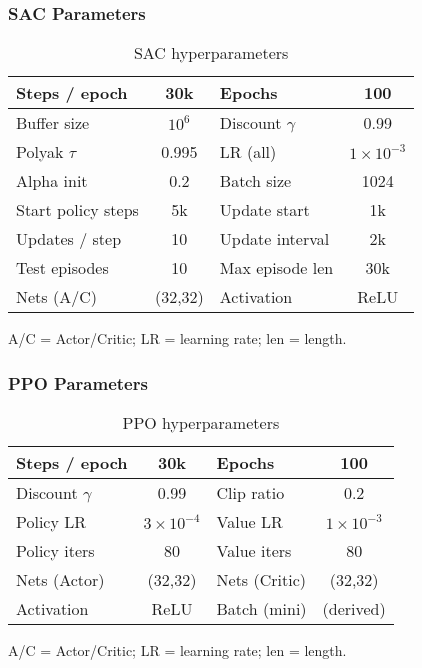 \begin{frame}
  \frametitle{SAC Parameters}
  \footnotesize
  \begin{table}
    \centering
    {\setlength{\tabcolsep}{4pt}\renewcommand{\arraystretch}{1.3}%
      \begin{tabular}{|l|c||l|c|}
      \hline
      Steps / epoch & 30k & Epochs & 100 \\ \hline
      Buffer size & $10^{6}$ & Discount $\gamma$ & 0.99 \\ \hline
      Polyak $\tau$ & 0.995 & LR (all) & $1\!\times\!10^{-3}$ \\ \hline
      Alpha init & 0.2 & Batch size & 1024 \\ \hline
      Start policy steps & 5k & Update start & 1k \\ \hline
      Updates / step & 10 & Update interval & 2k \\ \hline
      Test episodes & 10 & Max episode len & 30k \\ \hline
      Nets (A/C) & (32,32) & Activation & ReLU \\ \hline
      \end{tabular}
    }
    \caption{SAC hyperparameters}
    \label{tab:sac}
  \end{table}
  {\tiny A/C = Actor/Critic; LR = learning rate; len = length.}
\end{frame}

\begin{frame}
  \frametitle{PPO Parameters}
  \footnotesize
  \begin{table}
    \centering
    {\setlength{\tabcolsep}{4pt}\renewcommand{\arraystretch}{1.3}%
      \begin{tabular}{|l|c||l|c|}
      \hline
      Steps / epoch & 30k & Epochs & 100 \\ \hline
      Discount $\gamma$ & 0.99 & Clip ratio & 0.2 \\ \hline
      Policy LR & $3\!\times\!10^{-4}$ & Value LR & $1\!\times\!10^{-3}$ \\ \hline
      Policy iters & 80 & Value iters & 80 \\ \hline
      Nets (Actor) & (32,32) & Nets (Critic) & (32,32) \\ \hline
      Activation & ReLU & Batch (mini) & (derived) \\ \hline
      \end{tabular}
    }
    \caption{PPO hyperparameters}
    \label{tab:ppo}
  \end{table}
  {\tiny A/C = Actor/Critic; LR = learning rate; len = length.}
\end{frame}

